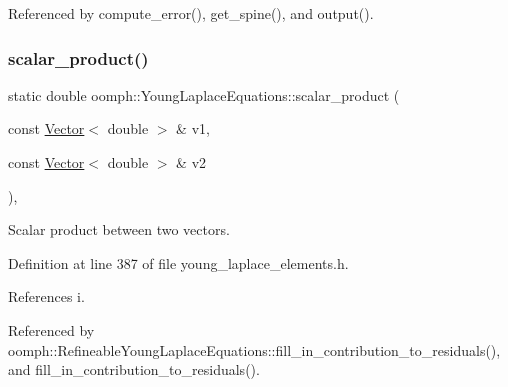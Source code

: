 Referenced by compute\+\_\+error(), get\+\_\+spine(), and output().

\mbox{\label{classoomph_1_1YoungLaplaceEquations_a377068e0e409cd58e4af567bdc4dc68b}} 
\subsubsection{\texorpdfstring{scalar\+\_\+product()}{scalar\_product()}}
{\footnotesize\ttfamily static double oomph\+::\+Young\+Laplace\+Equations\+::scalar\+\_\+product (\begin{DoxyParamCaption}\item[{const \hyperlink{classoomph_1_1Vector}{Vector}$<$ double $>$ \&}]{v1,  }\item[{const \hyperlink{classoomph_1_1Vector}{Vector}$<$ double $>$ \&}]{v2 }\end{DoxyParamCaption})\hspace{0.3cm}{\ttfamily [inline]}, {\ttfamily [static]}}



Scalar product between two vectors. 



Definition at line 387 of file young\+\_\+laplace\+\_\+elements.\+h.



References i.



Referenced by oomph\+::\+Refineable\+Young\+Laplace\+Equations\+::fill\+\_\+in\+\_\+contribution\+\_\+to\+\_\+residuals(), and fill\+\_\+in\+\_\+contribution\+\_\+to\+\_\+residuals().

\mbox{\label{classoomph_1_1YoungLaplaceEquations_a1df29bef40248ef56647ce5af2695ca5}} 
